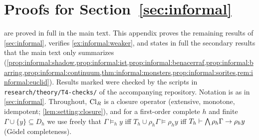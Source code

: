 \providecommand{\Stg}[2]{\mathrm{St}^{#1}_{#2}}
\providecommand{\Adm}[1]{\mathcal V_{#1}}
\providecommand{\Mint}{\mathbb M}
\providecommand{\Prem}{\mathrm{Prem}}
\providecommand{\Ch}{\mathrm{Ch}}
\providecommand{\Ldim}{\mathrm{Ldim}}
\providecommand{\Mobj}{M_{\mathrm{obj}}}
\providecommand{\Mbag}[1]{M^{(#1)}_{\mathrm{bag}}}
\providecommand{\Comp}{\mathrm{Comp}}
\providecommand{\cov}{\mathrm{cov}}
\providecommand{\MDL}{\mathrm{MDL}}
\providecommand{\REP}{\mathrm{REP}}
\providecommand{\RCH}{\mathrm{RCH}}
\providecommand{\ZF}{\mathsf{ZF}}
\providecommand{\ZFC}{\mathsf{ZFC}}
\providecommand{\IST}{\mathsf{IST}}
\providecommand{\nneg}{{\sim}}

\section{Proofs for Section~\ref{sec:informal}}\label{app:informal}

 are proved in full in the main text. This appendix proves the remaining results of \cref{sec:informal}, verifies \cref{ex:informal:weaker}, and states in full the secondary results that the main text only summarizes (\cref{prop:informal:shadow,prop:informal:ist,prop:informal:benacerraf,prop:informal:barring,prop:informal:continuum,thm:informal:monsters,prop:informal:sorites,rem:informal:euclid}). Results marked  were checked by the scripts in \texttt{research/theory/T4-checks/} of the accompanying repository. Notation is as in \cref{sec:informal}. Throughout, $\mathrm{Cl}_R$ is a closure operator (extensive, monotone, idempotent; \cref{lem:setting:closure}), and for a first-order complete $h$ and finite $\Gamma\cup\{y\}\subseteq D_h$ we use freely that $\Gamma\models_hy$ iff $T_h\cup\rho_h\Gamma\models\rho_hy$ iff $T_h\vdash\bigwedge\rho_h\Gamma\to\rho_hy$ (Gödel completeness).


